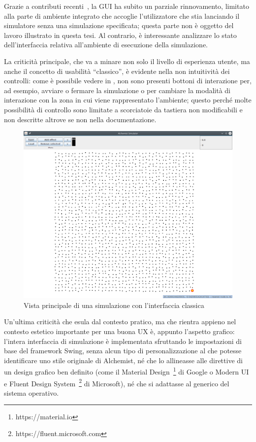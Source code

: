                 Grazie a contributi recenti~\cite{casadio}, la GUI ha subito un parziale rinnovamento, limitato alla parte di ambiente integrato che accoglie l'utilizzatore che stia lanciando il simulatore senza una simulazione specificata; questa parte non è oggetto del lavoro illustrato in questa tesi. Al contrario, è interessante analizzare lo stato dell'interfaccia relativa all'ambiente di esecuzione della simulazione.

                La criticità principale, che va a minare non solo il livello di esperienza utente, ma anche il concetto di usabilità  ``classico'', è evidente nella non intuitività dei controlli: come è possibile vedere in , non sono presenti bottoni di interazione per, ad esempio, avviare o fermare la simulazione o per cambiare la modalità di interazione con la zona in cui viene rappresentato l'ambiente; questo perché molte possibilità di controllo sono limitate a scorciatoie da tastiera non modificabili e non descritte altrove se non nella documentazione.

                \begin{figure}[htbp]
                    \centering
                    \includegraphics[scale=.35]{img/oldMain}
                    \caption{Vista principale di una simulazione con l'interfaccia classica}
                    \label{fig:oldMain}
                \end{figure}

                Un'ultima criticità che esula dal contesto pratico, ma che rientra appieno nel contesto estetico importante per una buona UX è, appunto l'aspetto grafico: l'intera interfaccia di simulazione è implementata sfruttando le impostazioni di base del framework Swing, senza alcun tipo di personalizzazione al  che potesse identificare uno stile originale di Alchemist, né che lo allineasse alle direttive di un design grafico ben definito (come il Material Design~\footnote{https://material.io} di Google o Modern UI e Fluent Design System~\footnote{https://fluent.microsoft.com} di Microsoft), né che si adattasse al  generico del sistema operativo.

